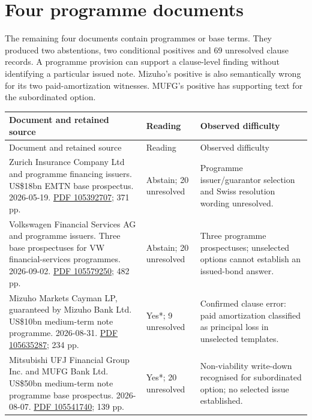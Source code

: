 \documentclass[12pt,a4paper,oneside,openany]{book}
\begin{document}
\section{Four programme documents}

The remaining four documents contain programmes or base terms. They produced
two abstentions, two conditional positives and 69 unresolved clause records.
A programme provision can support a clause-level finding without identifying
a particular issued note. Mizuho's positive is also semantically wrong for
its two paid-amortization witnesses. MUFG's positive has supporting text for
the subordinated option.

{\small
\begin{longtable}{P{0.44\textwidth}P{0.12\textwidth}P{0.34\textwidth}}
\toprule
Document and retained source & Reading & Observed difficulty \\
\midrule
\endfirsthead
\toprule
Document and retained source & Reading & Observed difficulty \\
\midrule
\endhead
Zurich Insurance Company Ltd and programme financing issuers. US\$18bn EMTN base prospectus. 2026-05-19. \href{../prospectus/difficulty-2026-10-04/pdfs/case-105392707.pdf}{PDF 105392707}; 371 pp. & Abstain; 20 unresolved & Programme issuer/guarantor selection and Swiss resolution wording unresolved. \\

Volkswagen Financial Services AG and programme issuers. Three base prospectuses for VW financial-services programmes. 2026-09-02. \href{../prospectus/difficulty-2026-10-04/pdfs/case-105579250.pdf}{PDF 105579250}; 482 pp. & Abstain; 20 unresolved & Three programme prospectuses; unselected options cannot establish an issued-bond answer. \\

Mizuho Markets Cayman LP, guaranteed by Mizuho Bank Ltd. US\$10bn medium-term note programme. 2026-08-31. \href{../prospectus/difficulty-2026-10-04/pdfs/case-105635287.pdf}{PDF 105635287}; 234 pp. & Yes*; 9 unresolved & Confirmed clause error: paid amortization classified as principal loss in unselected templates. \\

Mitsubishi UFJ Financial Group Inc. and MUFG Bank Ltd. US\$50bn medium-term note programme base prospectus. 2026-08-07. \href{../prospectus/difficulty-2026-10-04/pdfs/case-105541740.pdf}{PDF 105541740}; 139 pp. & Yes*; 20 unresolved & Non-viability write-down recognised for subordinated option; no selected issue established. \\
\bottomrule
\end{longtable}
}
\end{document}
